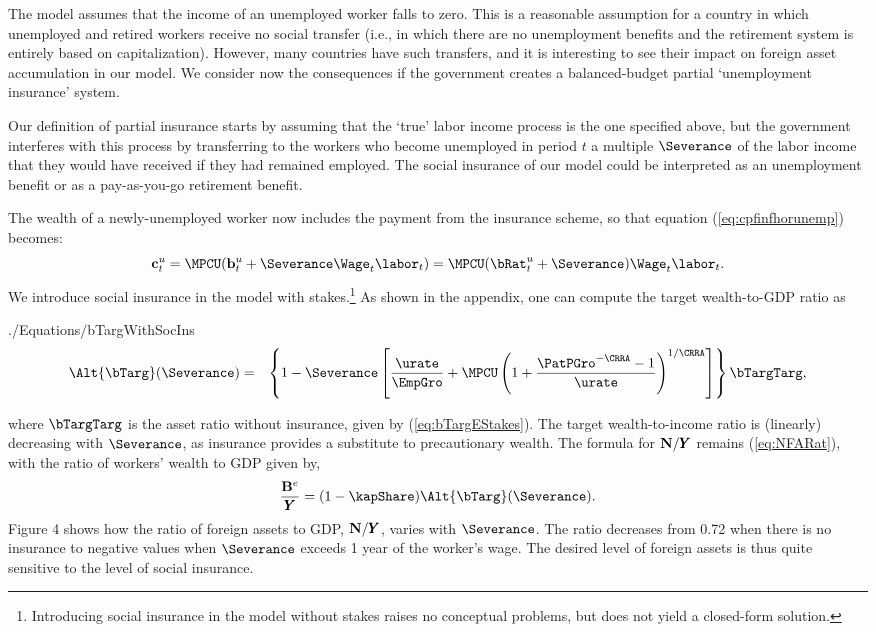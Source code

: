 \documentclass[titlepage]{\econtex}\newcommand{\texname}{cjSOE}
\renewcommand{\GDPLev}{\ensuremath{\pmb{Y}}}
\begin{document}
The model assumes that the income of an unemployed worker falls to
zero. This is a reasonable assumption for a country in which
unemployed and retired workers receive no social transfer (i.e., in
which there are no unemployment benefits and the retirement system is
entirely based on capitalization). However, many countries have such
transfers, and it is interesting to see their impact on foreign asset
accumulation in our model. We consider now the consequences if the
government creates a balanced-budget partial `unemployment insurance'
system.

Our definition of partial insurance starts by assuming that the `true'
labor income process is the one specified above, but the government
interferes with this process by transferring to the workers who become unemployed in period $t$ a multiple $\Severance$ of the labor income that they would have received if they had remained employed. The social insurance of our model could be interpreted as an unemployment benefit or as a pay-as-you-go retirement benefit.

The wealth of a newly-unemployed worker now includes the payment from the insurance scheme, so that equation (\ref{eq:cpfinfhorunemp}) becomes:
\begin{equation*}
\cLevU_{t}=\MPCU (\bLev^{u}_t+\Severance \Wage_t \labor_t)=\MPCU (\bRat^{u}_t+\Severance)\Wage_t \labor_t.
\end{equation*}
We introduce social insurance in the model with stakes.\footnote{Introducing social insurance in the model without stakes raises no conceptual problems, but does not yield a closed-form solution.} As shown in the appendix, one can compute the target wealth-to-GDP ratio as
\begin{verbatimwrite}{./Equations/bTargWithSocIns}
\begin{eqnarray}
\Alt{\bTarg}(\Severance) & = &
\left\{1-\Severance \left[\frac{\urate}{\EmpGro}+\MPCU \left(1+\frac{\PatPGro^{-\CRRA}-1}{\urate}\right)^{1/\CRRA}\right]\right\}\bTargTarg,
\label{eq:bTargWithSocIns}
\end{eqnarray}
\end{verbatimwrite}

where $\bTargTarg$ is the asset ratio without insurance, given by (\ref{eq:bTargEStakes}). The target wealth-to-income ratio is (linearly) decreasing with $\Severance$, as insurance provides a substitute to precautionary wealth. The formula for $\NFALev/\GDPLev$ remains (\ref{eq:NFARat}), with the ratio of workers' wealth to GDP given by,
\begin{equation}
\frac{\BLevE}{\GDPLev}=(1-\kapShare) \Alt{\bTarg}(\Severance).
\label{eq:STargWithSocIns}
\end{equation}
Figure 4 shows how the ratio of foreign assets to GDP, $\NFALev/\GDPLev$, varies with $\Severance$. The ratio decreases from 0.72 when there is no insurance to negative values when $\Severance$ exceeds 1 year of the worker's wage. The desired level of foreign assets is thus quite sensitive to the level of social insurance.
\end{document}
